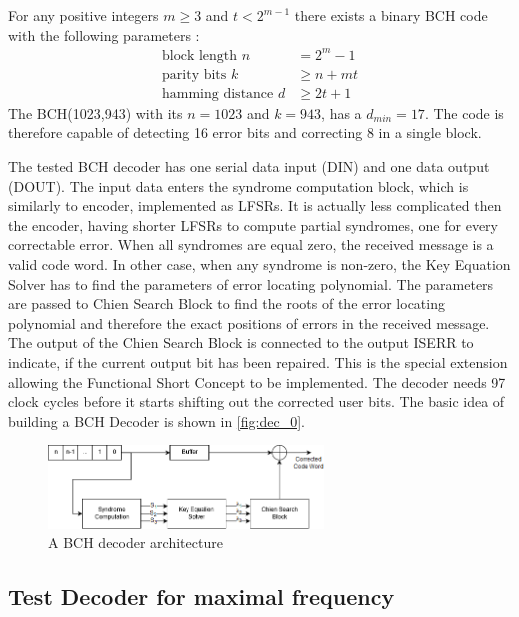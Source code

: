 For any positive integers $m \geq 3$ and $t<2^{m-1}$ there exists a binary BCH code with the following parameters \cite{art:BCH_implement}:
\begin{subequations}
\begin{align}
    \text{block length }n&=2^{m}-1\label{eq:blck_len}\\
    \text{parity bits }k&\geq n+mt\label{eq:parity}\\
    \text{hamming distance }d&\geq2t+1\label{eq:dmin}
\end{align}
\end{subequations}
The BCH(1023,943) with its $n = 1023$ and $k=943$, has a $d_{min}= 17$. The code is therefore capable of detecting 16 error bits and correcting 8 in a single block. 

The tested BCH decoder has one serial data input (DIN) and one data output (DOUT). The input data enters the syndrome computation block, which is similarly to encoder, implemented as LFSRs. It is actually less complicated then the encoder, having shorter LFSRs to compute partial syndromes, one for every correctable error. When all syndromes are equal zero, the received message is a valid code word. In other case, when any syndrome is non-zero, the Key Equation Solver has to find the parameters of error locating polynomial. The parameters are passed to Chien Search Block to find the roots of the error locating polynomial and therefore the exact positions of errors in the received message. The output of the Chien Search Block is connected to the output ISERR to indicate, if the current output bit has been repaired. This is the special extension allowing the Functional Short Concept to be implemented. The decoder needs 97 clock cycles before it starts shifting out the corrected user bits. The basic idea of building a BCH Decoder is shown in \autoref{fig:dec_0}.

\begin{figure}[h]
\centering
\includegraphics[width=0.65\textwidth]{figures/BCH_DEC.png}
\caption{A BCH decoder architecture \cite{art:BCH_implement}}
\label{fig:dec_0}
\end{figure}

\subsection{Test Decoder for maximal frequency}

